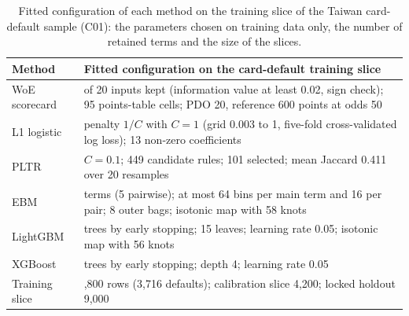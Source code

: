 \begin{table}[htbp]
\centering
\small
\caption{Fitted configuration of each method on the training slice of the Taiwan card-default sample (C01): the parameters chosen on training data only, the number of retained terms and the size of the slices.}
\label{tab:cs-fit}
\begin{tabular}{lp{11cm}}
\toprule
Method & Fitted configuration on the card-default training slice \\
\midrule
\relax WoE scorecard & \relax 13 of 20 inputs kept (information value at least 0.02, sign check); 95 points-table cells; PDO 20, reference 600 points at odds 50 \\
\relax L1 logistic & \relax penalty $1/C$ with $C=1$ (grid 0.003 to 1, five-fold cross-validated log loss); 13 non-zero coefficients \\
\relax PLTR & \relax $C=0.1$; 449 candidate rules; 101 selected; mean Jaccard 0.411 over 20 resamples \\
\relax EBM & \relax 25 terms (5 pairwise); at most 64 bins per main term and 16 per pair; 8 outer bags; isotonic map with 58 knots \\
\relax LightGBM & \relax 94 trees by early stopping; 15 leaves; learning rate 0.05; isotonic map with 56 knots \\
\relax XGBoost & \relax 127 trees by early stopping; depth 4; learning rate 0.05 \\
\relax Training slice & \relax 16,800 rows (3,716 defaults); calibration slice 4,200; locked holdout 9,000 \\
\bottomrule
\end{tabular}
\end{table}
